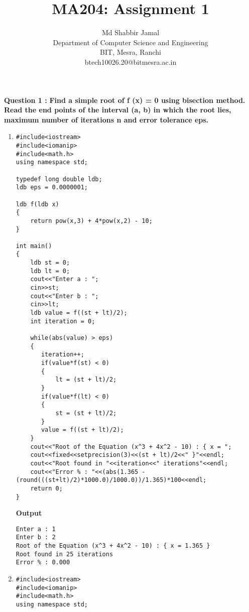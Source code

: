 \documentclass{article}
\title{MA204: Assignment 1}
\author{Md Shabbir Jamal\\
Department of Computer Science and Engineering\\
BIT, Mesra, Ranchi\\
btech10026.20@bitmesra.ac.in
}
\begin{document}
\maketitle
{\Large\textbf{Question 1 :}}
\textbf {Find a simple root of f (x) = 0 using bisection method. Read the end points of the interval (a, b) in which the root lies, maximum number of iterations n and error tolerance eps.}
\begin{enumerate}
\item {
\bgroup{}
\begin{verbatim}
#include<iostream>
#include<iomanip>
#include<math.h>
using namespace std;

typedef long double ldb;
ldb eps = 0.0000001;

ldb f(ldb x)
{
    return pow(x,3) + 4*pow(x,2) - 10;
}

int main()
{
    ldb st = 0;
    ldb lt = 0;
    cout<<"Enter a : ";
    cin>>st;
    cout<<"Enter b : ";
    cin>>lt;
    ldb value = f((st + lt)/2);
    int iteration = 0;

    while(abs(value) > eps)
    {
       iteration++;
       if(value*f(st) < 0)
       {
           lt = (st + lt)/2; 
       }
       if(value*f(lt) < 0)
       {
           st = (st + lt)/2; 
       }
       value = f((st + lt)/2);
    }
    cout<<"Root of the Equation (x^3 + 4x^2 - 10) : { x = ";
    cout<<fixed<<setprecision(3)<<(st + lt)/2<<" }"<<endl;
    cout<<"Root found in "<<iteration<<" iterations"<<endl;
    cout<<"Error % : "<<(abs(1.365 - (round(((st+lt)/2)*1000.0)/1000.0))/1.365)*100<<endl;
    return 0;
}
\end{verbatim}
\textbf{Output}
\begin{verbatim}
Enter a : 1
Enter b : 2
Root of the Equation (x^3 + 4x^2 - 10) : { x = 1.365 }
Root found in 25 iterations
Error % : 0.000
\end{verbatim}
}

\item {
\bgroup{}
\begin{verbatim}
#include<iostream>
#include<iomanip>
#include<math.h>
using namespace std;


\end{verbatim}}
\end{enumerate}
\end{document}
